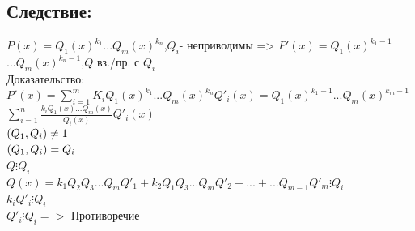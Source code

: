 \documentclass[12pt]{article}
\let\gcd\relax
\DeclareMathOperator{\gcd}{НОД}
\begin{document}
\subsection{Следствие:}
\noindent $P(x)=Q_1(x)^{k_1}$$... Q_m(x)^{k_n}$,$Q_i$- неприводимы => $P'(x)=Q_1(x)^{k_1-1}$$... Q_m(x)^{k_n-1}$,$Q$ вз./пр. с $Q_i$
\\Доказательство:
\\$P'(x)=\sum\limits _{i=1}^{m} K_iQ_1(x)^{k_1}$$...Q_m(x)^{k_n}$$Q'_i(x)=Q_1(x)^{k_1-1}$$...Q_m(x)^{k_m-1}$$\sum\limits _{i=1}^{n}\frac{k_iQ_1(x)...Q_m(x)}{Q_i(x)}Q'_i(x)$
    \\$\gcd(Q_1,Q_i)\neq 1$
\\$\gcd(Q_1,Q_i) = Q_i$
    \\$Q \vdots Q_i$
\\$Q(x)= k_1Q_2Q_3...Q_mQ'_1+k_2Q_1Q_3...Q_mQ'_2+...+...Q_{m-1}Q'_m\vdots Q_i$
    \\$k_iQ'_i\vdots Q_i$
\\$Q'_i\vdots Q_i =>$ Противоречие
\end{document}
